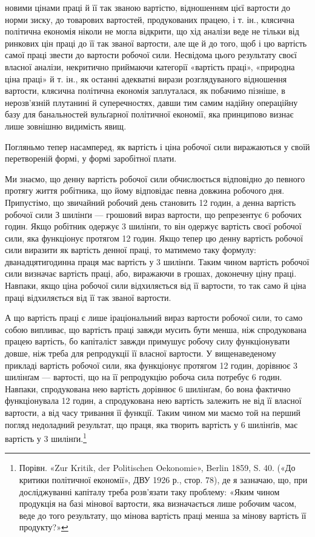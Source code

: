 новими цінами праці й її так званою вартістю, відношенням цієї
вартости до норми зиску, до товарових вартостей, продукованих
працею, і т. ін., клясична політична економія ніколи не могла
відкрити, що хід аналізи веде не тільки від ринкових цін праці
до її так званої вартости, але ще й до того, щоб і цю вартість
самої праці звести до вартости робочої сили. Несвідома цього
результату своєї власної аналізи, некритично приймаючи категорії
«вартість праці», «природна ціна праці» й т. ін., як останні
адекватні вирази розглядуваного відношення вартости, клясична
політична економія заплуталася, як побачимо пізніше, в нерозв’язній
плутанині й суперечностях, давши тим самим надійну
операційну базу для банальностей вульґарної політичної економії,
яка принципово визнає лише зовнішню видимість явищ.

Погляньмо тепер насамперед, як вартість і ціна робочої сили
виражаються у своїй перетвореній формі, у формі заробітної
плати.

Ми знаємо, що денну вартість робочої сили обчислюється
відповідно до певного протягу життя робітника, що йому відповідає
певна довжина робочого дня. Припустімо, що звичайний
робочий день становить 12 годин, а денна вартість робочої сили
З шилінґи — грошовий вираз вартости, що репрезентує 6 робочих
годин. Якщо робітник одержує 3 шилінґи, то він одержує вартість
своєї робочої сили, яка функціонує протягом 12 годин.
Якщо тепер цю денну вартість робочої сили виразити як вартість
денної праці, то матимемо таку формулу: дванадцятигодинна
праця має вартість у 3 шилінґи. Таким чином вартість
робочої сили визначає вартість праці, або, виражаючи в грошах,
доконечну ціну праці. Навпаки, якщо ціна робочої сили
відхиляється від її вартости, то так само й ціна праці відхиляється
від її так званої вартости.

А що вартість праці є лише іраціональний вираз вартости
робочої сили, то само собою випливає, що вартість праці завжди
мусить бути менша, ніж спродукована працею вартість, бо капіталіст
завжди примушує робочу силу функціонувати довше,
ніж треба для репродукції її власної вартости. У вищенаведеному
прикладі вартість робочої сили, яка функціонує протягом
12 годин, дорівнює 3 шилінґам — вартості, що на її репродукцію
робоча сила потребує 6 годин. Навпаки, спродукована
нею вартість дорівнює 6 шилінґам, бо вона фактично функціонувала
12 годин, а спродукована нею вартість залежить не від її
власної вартости, а від часу тривання її функції. Таким чином
ми маємо той на перший погляд недоладний результат, що праця,
яка творить вартість у 6 шилінґів, має вартість у 3 шилінґи.\footnote{
Порівн. «Zur Kritik, der Politischen Oekonomie», Berlin 1859,
S. 40. («До критики політичної економії», ДВУ 1926 р., стор. 78), де я
зазначаю, що, при досліджуванні капіталу треба розв’язати таку проблему:
«Яким чином продукція на базі мінової вартости, яка визначається
лише робочим часом, веде до того результату, що мінова вартість
праці менша за мінову вартість її продукту?»
}